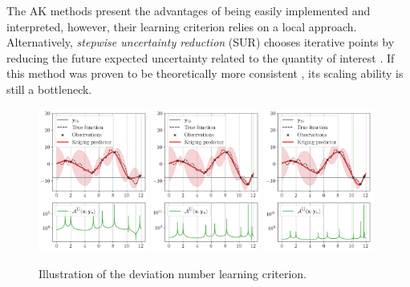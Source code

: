 The AK methods present the advantages of being easily implemented and interpreted, however, their learning criterion relies on a local approach. 
Alternatively, \textit{stepwise uncertainty reduction} (SUR) chooses iterative points by reducing the future expected uncertainty related to the quantity of interest \citep{bect_ginsbourger_2012}. 
If this method was proven to be theoretically more consistent \citep{bect_ginsbourger_2019}, its scaling ability is still a bottleneck.  

\begin{figure}[ht]
    \centering
    \includegraphics[width=0.32\textwidth]{../numerical_experiments/chapter1/figures/contour_find_0.png}
    \includegraphics[width=0.32\textwidth]{../numerical_experiments/chapter1/figures/contour_find_1.png}
    \includegraphics[width=0.32\textwidth]{../numerical_experiments/chapter1/figures/contour_find_2.png}
    \caption{Illustration of the deviation number learning criterion.}
    \label{fig:AK_1D}
\end{figure}

